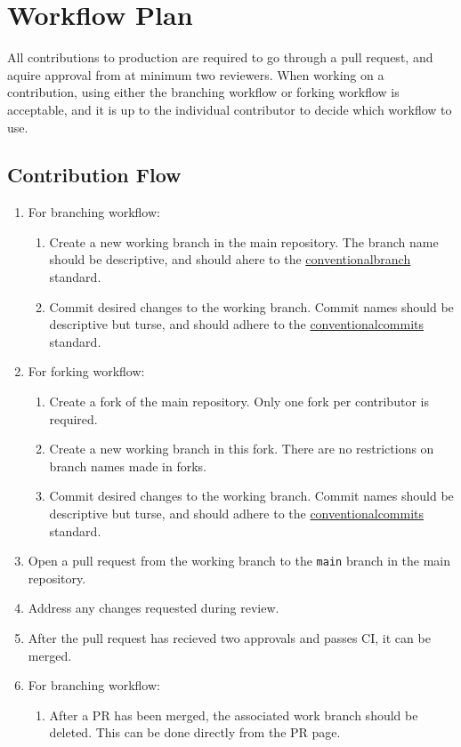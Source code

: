 \documentclass{article}
\begin{document}
\section{Workflow Plan}

All contributions to production are required to go through a pull request, and aquire approval from
at minimum two reviewers. When working on a contribution, using either the branching workflow or
forking workflow is acceptable, and it is up to the individual contributor to decide which workflow
to use.

\subsection{Contribution Flow}
\begin{enumerate}
	\item For branching workflow:
		\begin{enumerate}
			\item Create a new working branch in the main repository. The branch name should be
				descriptive, and should ahere to the
				\href{https://conventionalbranch.org/}{conventionalbranch} standard.
			\item Commit desired changes to the working branch. Commit names should be descriptive
				but turse, and should adhere to the
				\href{https://www.conventionalcommits.org/en/v1.0.0/}{conventionalcommits}
				standard.
		\end{enumerate}
	\item For forking workflow:
		\begin{enumerate}
			\item Create a fork of the main repository. Only one fork per contributor is required.
			\item Create a new working branch in this fork. There are no restrictions on branch
				names made in forks.
			\item Commit desired changes to the working branch. Commit names should be descriptive
				but turse, and should adhere to the
				\href{https://www.conventionalcommits.org/en/v1.0.0/}{conventionalcommits}
				standard.
		\end{enumerate}
	\item Open a pull request from the working branch to the \verb|main| branch in the main repository.
	\item Address any changes requested during review.
	\item After the pull request has recieved two approvals and passes CI, it can be merged.
	\item For branching workflow:
		\begin{enumerate}
			\item After a PR has been merged, the associated work branch should be deleted. This can
				be done directly from the PR page.
		\end{enumerate}
\end{enumerate}
\end{document}
